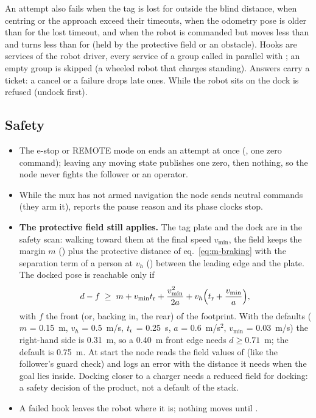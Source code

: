 An attempt also fails when the tag is lost for  outside the
blind distance, when centring or the approach exceed their timeouts, when the odometry pose is
older than  for the lost timeout, and when the robot is
commanded but moves less than  and turns less than
 for  (held by the protective field or an
obstacle). Hooks are  services of the robot driver, every service of a
group called in parallel with ; an empty group is skipped (a wheeled
robot that charges standing). Answers carry a ticket: a cancel or a failure drops late ones.
While the robot sits on the dock  is refused (undock first).

\subsection{Safety}

\begin{itemize}
  \item The e-stop or REMOTE mode on  ends an attempt at once
    (, one zero command); leaving any moving state publishes one zero, then nothing,
    so the node never fights the follower or an operator.
  \item While the mux has not armed navigation the node sends neutral commands (they arm it),
    reports the pause reason  and its phase clocks stop.
  \item \textbf{The protective field still applies.} The tag plate and the dock are in the
    safety scan: walking toward them at the final speed $v_{\min}$, the field keeps the margin
    $m$ () plus the protective distance of eq.~\eqref{eq:m-braking} with the
    separation term of a person at $v_h$ () between the leading edge
    and the plate. The docked pose is reachable only if
    \begin{equation}
      d - f \;\ge\; m + v_{\min}t_{\mathrm{r}} + \frac{v_{\min}^2}{2a} + v_h\Big(t_{\mathrm{r}} + \frac{v_{\min}}{a}\Big),
    \end{equation}
    with $f$ the front (or, backing in, the rear) of the footprint. With the defaults
    ($m$ = 0.15~m, $v_h$ = 0.5~m/s, $t_{\mathrm{r}}$ = 0.25~s, $a$ = 0.6~m/s$^2$, $v_{\min}$ = 0.03~m/s)
    the right-hand side is 0.31~m, so a 0.40~m front edge needs $d \ge 0.71$~m; the default
     is 0.75~m. At start the node reads the field values of
     (like the follower's guard check) and logs an error with the distance
    it needs when the goal lies inside. Docking closer to a charger needs a reduced field for
    docking: a safety decision of the product, not a default of the stack.
  \item A failed hook leaves the robot where it is; nothing moves until .
\end{itemize}


